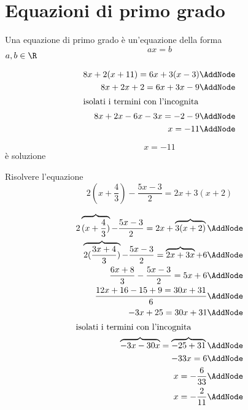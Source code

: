 \section{Equazioni di primo grado}
\label{sec:equazionidiprimogrado}
Una equazione di primo grado è un'equazione della forma \[ax=b\]
$a,b\in\R$
\begin{esempio}
 \begin{NodesList}[margin=3cm]
  \begin{align*}
  8x+2(x+11) = 6x+3(x-3) \AddNode\\
  8x+2x+2  = 6x+3x-9 \AddNode\\
  \intertext{\hfil isolati i termini con l'incognita \hfil}
  8x+2x-6x-3x  = -2-9 \AddNode\\
    x  = -11 \AddNode
  \end{align*}
  \LinkNodes{ }
  \end{NodesList}
  \[x=-11\]
  è soluzione
\end{esempio}
\begin{esempio}
Risolvere l'equazione \[2(x+\dfrac{4}{3})-\dfrac{5x-3}{2}=2x+3(x+2) \]
 \begin{NodesList}[margin=3cm]
  \begin{align*}
  2\overbrace{(x+\dfrac{4}{3})}-\dfrac{5x-3}{2}=2x+\overbrace{3(x+2)} \AddNode\\
\overbrace{2(\dfrac{3x+4}{3})}-\dfrac{5x-3}{2}=\overbrace{2x+3x}+6 \AddNode\\
  \dfrac{6x+8}{3}-\dfrac{5x-3}{2}=5x+6   \AddNode\\
 \dfrac{12x+16-15+9=30x+31}{6}   \AddNode\\
 -3x+25=30x+31\AddNode\\
  \intertext{\hfil isolati i termini con l'incognita \hfil}
 \overbrace{-3x-30x}=\overbrace{-25+31}\AddNode\\
 -33x=6\AddNode\\
 x=-\dfrac{6}{33}\AddNode\\
 x=-\dfrac{2}{11}\AddNode\\
  \end{align*}
  \end{NodesList}
\end{esempio}
